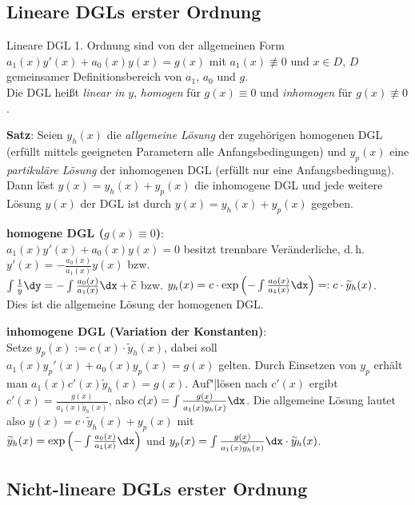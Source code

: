 \subsection{%
    Lineare DGLs erster Ordnung%
}

Lineare DGL 1. Ordnung sind von der allgemeinen Form
$a_1(x) y'(x) + a_0(x) y(x) = g(x)$
mit $a_1(x) \not\equiv 0$ und $x \in D$, $D$ gemeinsamer Definitionsbereich
von $a_1$, $a_0$ und $g$. \\
Die DGL heißt \emph{linear in $y$},
\emph{homogen} für $g(x) \equiv 0$ und \emph{inhomogen}
für $g(x) \not\equiv 0$.

\textbf{Satz}:
Seien $y_h(x)$ die \emph{allgemeine Lösung} der zugehörigen homogenen DGL
(erfüllt mittels geeigneten Parametern alle Anfangsbedingungen)
und $y_p(x)$ eine \emph{partikuläre Lösung} der inhomogenen DGL
(erfüllt nur eine Anfangsbedingung).
Dann löst $y(x) = y_h(x) + y_p(x)$ die inhomogene DGL und
jede weitere Lösung $y(x)$ der DGL ist durch $y(x) = y_h(x) + y_p(x)$
gegeben.

\textbf{homogene DGL ($g(x) \equiv 0$)}: \\
$a_1(x) y'(x) + a_0(x) y(x) = 0$ besitzt trennbare Veränderliche, d.\,h.
$y'(x) = -\frac{a_0(x)}{a_1(x)} y(x)$ bzw. \\
$\int \frac{1}{y} \dy = -\int \frac{a_0(x)}{a_1(x)}\dx + \widetilde{c}$ bzw.
$y_h(x) = c \cdot \exp\left(-\int \frac{a_0(x)}{a_1(x)}\dx\right) =:
c \cdot \widetilde{y}_h(x)$. \\
Dies ist die allgemeine Lösung der homogenen DGL.

\textbf{inhomogene DGL (Variation der Konstanten)}: \\
Setze $y_p(x) := c(x) \cdot \widetilde{y}_h(x)$, dabei soll
$a_1(x) y_p'(x) + a_0(x) y_p(x) = g(x)$ gelten.
Durch Einsetzen von $y_p$ erhält man $a_1(x) c'(x) \widetilde{y}_h(x) = g(x)$.
Auf"|lösen nach $c'(x)$ ergibt
$c'(x) = \frac{g(x)}{a_1(x) \widetilde{y}_h(x)}$,
also $c(x) = \int \frac{g(x)}{a_1(x) \widetilde{y}_h(x)}\dx$.
Die allgemeine Lösung lautet also $y(x) = c \cdot \widetilde{y}_h(x) + y_p(x)$
mit \\
$\widetilde{y}_h(x) = \exp\left(-\int \frac{a_0(x)}{a_1(x)}\dx\right)$ und
$y_p(x) = \int \frac{g(x)}{a_1(x) \widetilde{y}_h(x)}\dx
\cdot \widetilde{y}_h(x)$.

\subsection{%
    Nicht-lineare DGLs erster Ordnung%
}

